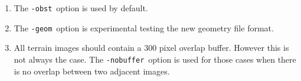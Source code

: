 

\begin{enumerate}
\item The {\tt -obst}\ option is used by default.
\item The {\tt -geom}\ option is experimental testing the new geometry file format.
\item All terrain images should contain a 300 pixel overlap buffer.  However
this is not always the case.  The {\tt -nobuffer}\ option is used for those
cases when there is no overlap between two adjacent images.
\end{enumerate}


